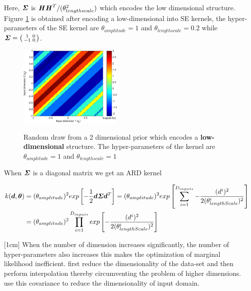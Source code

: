 Here, $\bm{\mathit{\Sigma}}$ is $\bm{\mathit{H}}\bm{\mathit{H}}^T/(\theta_{lengthscale}^2)$ which encodes the low dimensional structure. Figure \ref{subFigdrawsLowMultiDimensional} is obtained after encoding a low-dimensional into SE kernels, the hyper-parameters of the SE kernel are $\theta_{amplitude}=1$ and $\theta_{lengthscale}=0.2$ while $\bm{\mathit{\Sigma}} = \bigl( \begin{smallmatrix} 1 & 0\\ -1 & 0\end{smallmatrix}\bigr)$. 

\begin{figure}[!ht]
  \centering
   \includegraphics[width=0.45\textwidth]
        {images/part2/drawsLowMultiDimensional}
        \label{subFigdrawsLowMultiDimensional}
  \caption{Random draw from a 2 dimensional prior which encodes a \textbf{low-dimensional} structure. The hyper-parameters of the kernel are $\theta_{amplitude}=1$ and $\theta_{lengthscale}=1$}
\end{figure}

When $\bm{\mathit{\Sigma}}$ is a diagonal matrix we get an ARD kernel

\begin{equation}
\begin{aligned}
k(\boldsymbol{d}, \boldsymbol{\theta}) & = (\theta_{amplitude})^2  exp\left [  -\frac{1}{2} \boldsymbol{d} \bm{\mathit{\Sigma}} \boldsymbol{d}^T \right ] = 
(\theta_{amplitude})^2  exp\left [ \sum_{i=1}^{D_{inputs}} -\frac{(d^{i})^2}{2(\theta_{lengthScale}^{i})^2} \right ] \\
& = (\theta_{amplitude})^2 \prod_{i=1}^{D_{inputs}}  exp\left [ -\frac{(d^{i})^2}{2(\theta_{lengthScale}^{i})^2} \right ]
\end{aligned}
\end{equation}

[1cm]
When the number of dimension increases significantly, the number of hyper-parameters also increases this makes the optimization of marginal likelihood inefficient. \cite{bouhlel2016improved} first reduce the dimensionality of the data-set and then perform interpolation thereby circumventing the problem of higher dimensions. \cite{garnett2013active, tripathy2016gaussian} use this covariance to reduce the dimensionality of input domain.

